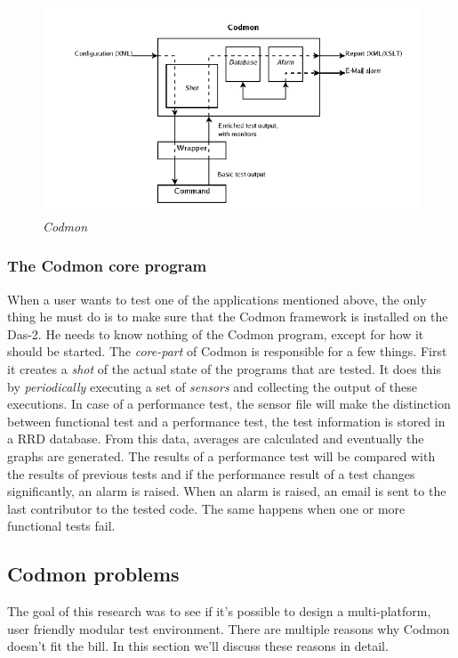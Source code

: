 \documentclass{article}
\begin{document}
\begin{figure}[!ht]
  \caption{\emph{Codmon}}
  \centering
    \includegraphics[scale=0.5]{codmon}
\end{figure}

\subsubsection{The Codmon core program}
\label{coreprogram}
\noindent When a user wants to test one of the applications mentioned above, the only thing he must do is to make sure that the Codmon framework is installed on the Das-2. He needs to know nothing of the 
Codmon program, except for how it should be started. The \emph{core-part} of Codmon is responsible for a few things. First it creates a \emph{shot} of the actual state of the programs that are 
tested. It does this by \emph{periodically} executing a set of \emph{sensors} and collecting the output of these executions. In case of a performance test, the sensor file will make the distinction between 
functional test and a performance test, the test information is stored in a RRD database\cite{RRD}. From this data, averages are calculated and eventually the graphs are generated\cite{Codmon}. The results 
of a performance test will be compared with the results of previous tests and if the performance result of a test changes significantly, an alarm is raised. When an alarm is raised, an email is sent 
to the last contributor to the tested code. The same happens when one or more functional tests fail.\\
 

\subsection{Codmon problems}
\label{subsec:CodmonProblems}
The goal of this research was to see if it's possible to design a multi-platform, user friendly modular test environment. There are multiple reasons why Codmon doesn't fit the bill. In this section
we'll discuss these reasons in detail.
 
\end{document}
